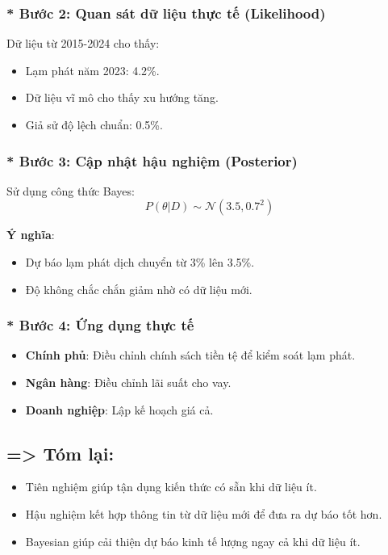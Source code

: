 \subsubsection{* Bước 2: Quan sát dữ liệu thực tế (Likelihood)}
Dữ liệu từ 2015-2024 cho thấy:
\begin{itemize}
    \item Lạm phát năm 2023: 4.2\%.
    \item Dữ liệu vĩ mô cho thấy xu hướng tăng.
    \item Giả sử độ lệch chuẩn: 0.5\%.
\end{itemize}

\subsubsection{* Bước 3: Cập nhật hậu nghiệm (Posterior)}
Sử dụng công thức Bayes:
\begin{equation}
    P(\theta | D) \sim \mathcal{N}(3.5, 0.7^2)
\end{equation}

\textbf{Ý nghĩa}:
\begin{itemize}
    \item Dự báo lạm phát dịch chuyển từ 3\% lên 3.5\%.
    \item Độ không chắc chắn giảm nhờ có dữ liệu mới.
\end{itemize}

\subsubsection{* Bước 4: Ứng dụng thực tế}
\begin{itemize}
    \item \textbf{Chính phủ}: Điều chỉnh chính sách tiền tệ để kiểm soát lạm phát.
    \item \textbf{Ngân hàng}: Điều chỉnh lãi suất cho vay.
    \item \textbf{Doanh nghiệp}: Lập kế hoạch giá cả.
\end{itemize}

\subsection* {=> Tóm lại:}
\begin{itemize}
    \item Tiên nghiệm giúp tận dụng kiến thức có sẵn khi dữ liệu ít.
    \item Hậu nghiệm kết hợp thông tin từ dữ liệu mới để đưa ra dự báo tốt hơn.
    \item Bayesian giúp cải thiện dự báo kinh tế lượng ngay cả khi dữ liệu ít.
\end{itemize}

